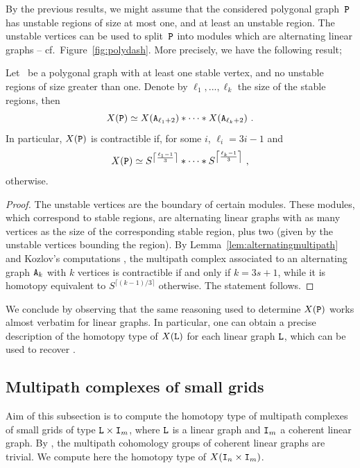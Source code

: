 \documentclass{amsart}
\begin{document}
By the previous results, we might assume that the considered polygonal graph~${\tt P}$ has unstable regions of size at most one, and at least an unstable region. The unstable vertices can be used to split~${\tt P}$ into modules which are alternating linear graphs -- cf.~Figure~\ref{fig:polydash}. More precisely, we have the following result;

\begin{prop}\label{lem:polygonalgraphs}
Let \tP~be a polygonal graph with at least one stable vertex, and no unstable regions of size greater than one. Denote by $\ell_1,...,\ell_k$ the size of the stable regions, then
\[ X(\tP) \simeq X(\tA_{\ell_1 +2}) \ast \cdots \ast X(\tA_{\ell_k +2}) \ . \]
In particular, $X({\tt P})$ is contractible if, for some $i$, $\ell_i = 3i - 1 $  and
\[ X({\tt P}) \simeq S^{\left\lceil \frac{\ell_1 - 1}{3} \right\rceil} \ast \cdots \ast  S^{\left\lceil \frac{\ell_k - 1}{3} \right\rceil} \ ,  \]
otherwise.\end{prop}
\begin{proof}
The unstable vertices are the boundary of certain modules. These modules, which correspond to stable regions, are alternating linear graphs with as many vertices as the size of the corresponding stable region, plus two (given by the unstable vertices bounding the region). By Lemma~\ref{lem:alternatingmultipath} and Kozlov's computations \cite[Proposition~4.6]{Kozlov99}, the multipath complex associated to an alternating graph ${\tt A}_k$ with $k$ vertices is contractible if and only if $k = 3s + 1$, while it is homotopy equivalent to $S^{\lceil (k-1)/3 \rceil}$ otherwise. The statement follows.
\end{proof}
 
We conclude by observing that the same reasoning used to determine $X({\tt P})$ works almost verbatim for linear graphs. In particular, one can obtain a precise description of the homotopy type of $X({\tt L})$ for each linear graph ${\tt L}$, which can be used to recover \cite[Theorem~1.1]{secondo}.
 
 
 
 
\subsection{Multipath complexes of small grids} 
 
Aim of this subsection is to compute the homotopy type of multipath complexes of small grids of type ${\tt L} \times {\tt I}_m$, where ${\tt L}$ is a linear graph and ${\tt I}_m$ a coherent linear graph. 
By \cite[Example~4.20]{primo}, the multipath cohomology groups of coherent linear graphs are trivial. We compute here the homotopy type of $X({\tt I}_n\times {\tt I}_m)$.
\end{document}

